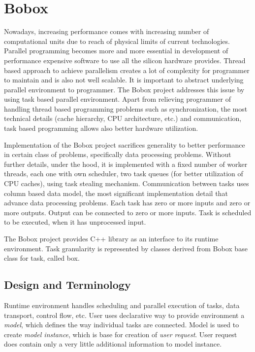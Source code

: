 \chapter{Bobox}
Nowadays, increasing performance comes with increasing number of computational units due to reach of physical limits of current technologies. Parallel programming becomes more and more essential in development of performance expensive software to use all the silicon hardware provides. Thread based approach to achieve parallelism creates a lot of complexity for programmer to maintain and is also not well scalable. It is important to abstract underlying parallel environment to programmer. The Bobox project addresses this issue by using task based parallel environment. Apart from relieving programmer of handling thread based programming problems such as synchronization, the most technical details (cache hierarchy, CPU architecture, etc.) and communication, task based programming allows also better hardware utilization.

Implementation of the Bobox project sacrifices generality to better performance in certain class of problems, specifically data processing problems. Without further details, under the hood, it is implemented with a fixed number of worker threads, each one with own scheduler, two task queues (for better utilization of CPU caches), using task stealing mechanism. Communication between tasks uses column based data model, the most significant implementation detail that advance data processing problems. Each task has zero or more inputs and zero or more outputs. Output can be connected to zero or more inputs. Task is scheduled to be executed, when it has unprocessed input.

The Bobox project provides C++ library as an interface to its runtime environment. Task granularity is represented by classes derived from Bobox base class for task, called box.

\section{Design and Terminology}
Runtime environment handles scheduling and parallel execution of tasks, data transport, control flow, etc. User uses declarative way to provide environment a \textit{model}, which defines the way individual tasks are connected. Model is used to create \textit{model instance}, which is base for creation of \textit{user request}. User request does contain only a very little additional information to model instance.

